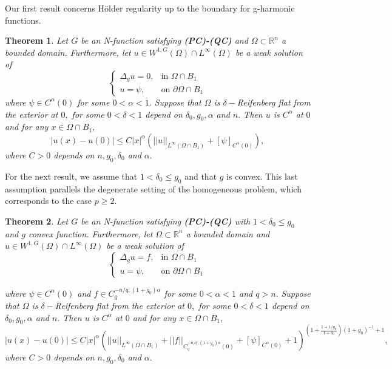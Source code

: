 \documentclass[11pt, leqno]{article}
\newtheorem{theorem}{Theorem}[section]
\theoremstyle{definition}
\theoremstyle{remark}
\numberwithin{equation}{section}
\begin{document}
Our first result concerns Hölder regularity up to the boundary for g-harmonic functions.

\begin{theorem}\label{thm1}
    Let $G$ be an N-function satisfying {\bf (PC)-(QC)} and $\Omega\subset \mathbb{R}^n$ a bounded domain. Furthermore, let $u\in W^{1,G}(\Omega)\cap L^\infty(\Omega)$ be a weak solution of 
     \[
     \begin{cases}
     \Delta_g u = 0, & \text{in } \Omega \cap B_1 \\[4pt]
      u = \psi, & \text{on } \partial\Omega \cap B_1
      \end{cases}
     \]
     where $\psi\in C^\alpha(0)$ for some $0<\alpha<1.$ Suppose that $\Omega$ is $\delta-$Reifenberg flat from the exterior at $0,$ for some $0<\delta<1$ depend on $\delta_0, g_0, \alpha$ and $n.$ Then $u$ is $C^\alpha$ at $0$ and for any $x\in \Omega\cap B_1,$
     $$|u(x)-u(0)| \leq C|x|^\alpha\left(||u||_{L^\infty(\Omega\cap B_1)}+ [\psi]_{C^\alpha(0)} \right), $$
     where $C>0$ depends on $n, g_0, \delta_0$ and $\alpha.$
\end{theorem}


 For the next result, we assume that $1<\delta_0\leq g_0$ and that $g$ is convex. This last assumption parallels the degenerate setting of the homogeneous problem, which corresponds to the case $p\geq 2.$


\begin{theorem}\label{thm2}
    Let $G$ be an N-function satisfying {\bf (PC)-(QC)} with $1<\delta_0\leq g_0$ and $g$ convex function. Furthermore, let $\Omega\subset \mathbb{R}^n$ a bounded domain and $u\in W^{1,G}(\Omega)\cap L^\infty(\Omega)$ be a weak solution of  
    \[
    \begin{cases}
    \Delta_g u = f, & \text{in } \Omega \cap B_1 \\
    u = \psi, & \text{on } \partial\Omega \cap B_1
    \end{cases}
    \]
    
     where $\psi\in C^\alpha(0)$ and $f\in C_q^{-n/q,(1+g_0)\alpha}$ for some $0<\alpha<1$ and $q>n.$ Suppose that $\Omega$ is $\delta-$Reifenberg flat from the exterior at $0,$ for some $0<\delta<1$ depend on $\delta_0, g_0, \alpha$ and $n.$ Then $u$ is $C^\alpha$ at $0$ and for any $x\in \Omega\cap B_1,$
     $$|u(x)-u(0)| \leq C|x|^\alpha\left(||u||_{L^\infty(\Omega\cap B_1)}+ ||f||_{C_q^{-n/q,(1+g_0)\alpha}(0)}+ [\psi]_{C^\alpha(0)} +1 \right)^{\left(1+\frac{1+1/g_0}{1+\delta_0}\right)(1+g_0)^{-1}+1}, $$
     where $C>0$ depends on $n, g_0, \delta_0$ and $\alpha.$
\end{theorem}
\end{document}
